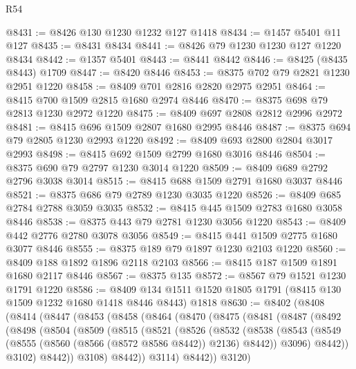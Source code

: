 \begin{lexlean}{R54}
\begin{coremodule}
@8431 := @8426 @130 @1230 @1232 @127 @1418
@8434 := @1457 @5401 @11 @127
@8435 := @8431 @8434
@8441 := @8426 @79 @1230 @1230 @127 @1220 @8434
@8442 := @1357 @5401
@8443 := @8441 @8442
@8446 := @8425 (@8435 @8443) @1709
@8447 := @8420 @8446
@8453 := @8375 @702 @79 @2821 @1230 @2951 @1220
@8458 := @8409 @701 @2816 @2820 @2975 @2951
@8464 := @8415 @700 @1509 @2815 @1680 @2974 @8446
@8470 := @8375 @698 @79 @2813 @1230 @2972 @1220
@8475 := @8409 @697 @2808 @2812 @2996 @2972
@8481 := @8415 @696 @1509 @2807 @1680 @2995 @8446
@8487 := @8375 @694 @79 @2805 @1230 @2993 @1220
@8492 := @8409 @693 @2800 @2804 @3017 @2993
@8498 := @8415 @692 @1509 @2799 @1680 @3016 @8446
@8504 := @8375 @690 @79 @2797 @1230 @3014 @1220
@8509 := @8409 @689 @2792 @2796 @3038 @3014
@8515 := @8415 @688 @1509 @2791 @1680 @3037 @8446
@8521 := @8375 @686 @79 @2789 @1230 @3035 @1220
@8526 := @8409 @685 @2784 @2788 @3059 @3035
@8532 := @8415 @445 @1509 @2783 @1680 @3058 @8446
@8538 := @8375 @443 @79 @2781 @1230 @3056 @1220
@8543 := @8409 @442 @2776 @2780 @3078 @3056
@8549 := @8415 @441 @1509 @2775 @1680 @3077 @8446
@8555 := @8375 @189 @79 @1897 @1230 @2103 @1220
@8560 := @8409 @188 @1892 @1896 @2118 @2103
@8566 := @8415 @187 @1509 @1891 @1680 @2117 @8446
@8567 := @8375 @135
@8572 := @8567 @79 @1521 @1230 @1791 @1220
@8586 := @8409 @134 @1511 @1520 @1805 @1791 (@8415 @130 @1509 @1232 @1680 @1418 @8446 @8443) @1818
@8630 := @8402
    (@8408
      (@8414
        (@8447
          (@8453
            (@8458
              (@8464
                (@8470
                  (@8475
                    (@8481
                      (@8487
                        (@8492
                          (@8498
                            (@8504
                              (@8509
                                (@8515
                                  (@8521
                                    (@8526
                                      (@8532
                                        (@8538
                                          (@8543
                                            (@8549
                                              (@8555
                                                (@8560 (@8566 (@8572 @8586 @8442)) @2136)
                                                @8442))
                                            @3096)
                                          @8442))
                                      @3102)
                                    @8442))
                                @3108)
                              @8442))
                          @3114)
                        @8442))
                    @3120)

\end{coremodule}
\end{lexlean}
